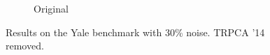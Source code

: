 \begin{figure}
\begin{subfigure}[b]{.19\linewidth}
    \caption{Original}
\end{subfigure}
\caption{Results on the Yale benchmark with 30\% noise. TRPCA '14 removed.}
\label{fig:visual_yale_30}
\end{figure}

